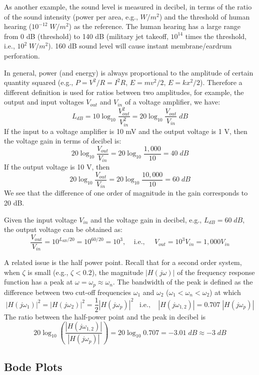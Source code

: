 As another example, the sound level is measured in decibel, in terms of the ratio
of the sound intensity (power per area, e.g., $W/m^2$) and the threshold of human 
hearing ($10^{-12}\; W/m^2$) as the reference. The human hearing has a large range 
from 0 dB (threshold) to 140 dB (military jet takeoff, $10^{14}$ times the threshold, 
i.e., $10^2\; W/m^2$). 160 dB sound level will cause instant membrane/eardrum 
perforation.

In general, power (and energy) is always proportional to the amplitude of certain
quantity squared (e.g., $P=V^2/R=I^2 R$, $E=mv^2/2$, $E=kx^2/2$). Therefore a 
different definition is used for ratios between two amplitudes, for example, the
output and input voltages $V_{out}$ and $V_{in}$ of a voltage amplifier, we have:
\[ L_{dB}=10 \log_{10} \frac{V^2_{out}}{V^2_{in}}
=20 \log_{10} \frac{V_{out}}{V_{in}}\;dB \]
If the input to a voltage amplifier is 10 mV and the output voltage is 1 V, then the
voltage gain in terms of decibel is:
\[ 20 \log_{10} \frac{V_{out}}{V_{in}}=20 \log_{10} \frac{1,000}{10}=40\; dB \]
If the output voltage is 10 V, then
\[ 20 \log_{10} \frac{V_{out}}{V_{in}}=20 \log_{10} \frac{10,000}{10}=60\; dB \]
We see that the difference of one order of magnitude in the gain corresponds to 20 dB.

Given the input voltage $V_{in}$ and the voltage gain in decibel, e.g., $L_{dB}=60\;dB$, 
the output voltage can be obtained as:
\[ \frac{V_{out}}{V_{in}}=10^{L_{dB}/20}=10^{60/20}=10^3,
\;\;\;\;\mbox{i.e.,}\;\;\;\;\; V_{out}=10^3 V_{in}=1,000 V_{in} \]

A related issue is the half power point. Recall that for a second order system, when
$\zeta$ is small (e.g., $\zeta<0.2$), the magnitude $|H(j\omega)|$ of the frequency 
response function has a peak at $\omega=\omega_p\approx \omega_n$. The bandwidth of 
the peak is defined as the difference between two cut-off frequencies $\omega_1$ 
and $\omega_2$ ($\omega_1<\omega_n < \omega_2$) at which 
\[ |H(j\omega_1)|^2=|H(j\omega_2)|^2=\frac{1}{2} |H(j\omega_p)|^2\;\;\;\mbox{i.e.,}\;\;\;\;
   | H(j\omega_{1,2}) |=0.707\; | H(j\omega_p) | \]
The ratio between the half-power point and the peak in decibel is
\[ 20 \log_{10} \left( \frac{ |H(j\omega_{1,2})|}{| H(j\omega_p) |} \right)
=20 \log_{10} 0.707=-3.01\;dB \approx -3\;dB \]

\subsection*{Bode Plots}

